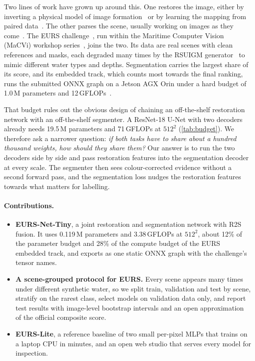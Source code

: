 \documentclass[10pt,twocolumn,letterpaper]{article}
\newcommand{\tinynet}{EURS-Net-Tiny}
\newcommand{\lite}{EURS-Lite}
\begin{document}
Two lines of work have grown up around this. One restores the image, either by inverting a physical model of
image formation~\cite{akkaynak2019seathru,he2011dark} or by learning the mapping from paired
data~\cite{li2020uieb,islam2020funie,desai2022aquagan,desai2023depthcue}. The other parses the scene, usually
working on images as they come~\cite{islam2020suim}. The EURS challenge~\cite{eurs2027challenge}, run within
the Maritime Computer Vision (MaCVi) workshop series~\cite{kiefer2025macvi,kiefer2026macvi}, joins the two.
Its data are real scenes with clean references and masks, each degraded many times by the RSUIGM
generator~\cite{desai2024rsuigm} to mimic different water types and depths. Segmentation carries the largest
share of its score, and its embedded track, which counts most towards the final ranking, runs the submitted
ONNX graph on a Jetson AGX Orin under a hard budget of 1.0\,M parameters and 12\,GFLOPs~\cite{eurs2027challenge}.

That budget rules out the obvious design of chaining an off-the-shelf restoration network with an
off-the-shelf segmenter. A ResNet-18 U-Net with two decoders already needs 19.5\,M parameters and
71\,GFLOPs at $512^2$ (\cref{tab:budget}). We therefore ask a narrower question: \emph{if both tasks have to
share about a hundred thousand weights, how should they share them?} Our answer is to run the two decoders
side by side and pass restoration features into the segmentation decoder at every scale. The segmenter
then sees colour-corrected evidence without a second forward pass, and the segmentation loss nudges the
restoration features towards what matters for labelling.

\paragraph{Contributions.}
\begin{itemize}\setlength\itemsep{1pt}
  \item \textbf{\tinynet{}}, a joint restoration and segmentation network with R2S fusion. It uses
        0.119\,M parameters and 3.38\,GFLOPs at $512^2$, about 12\% of the parameter budget and 28\% of
        the compute budget of the EURS embedded track, and exports as one static ONNX graph with the
        challenge's tensor names.
  \item \textbf{A scene-grouped protocol for EURS.} Every scene appears many times under different synthetic
        water, so we split train, validation and test by scene, stratify on the rarest class, select models
        on validation data only, and report test results with image-level bootstrap intervals and an open
        approximation of the official composite score.
  \item \textbf{\lite{}}, a reference baseline of two small per-pixel MLPs that trains on a laptop CPU in
        minutes, and an open web studio that serves every model for inspection.
\end{itemize}
\end{document}
